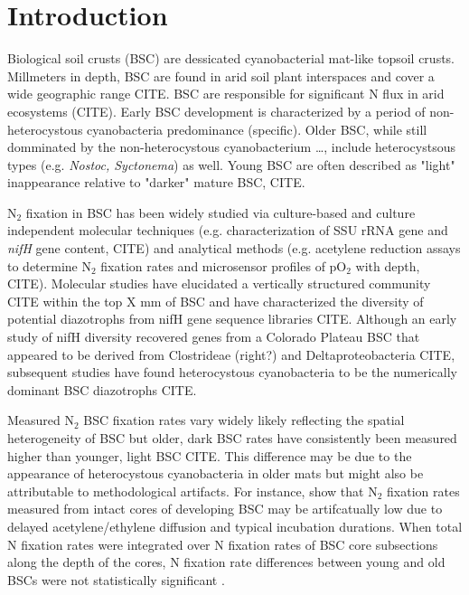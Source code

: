 \section{Introduction}


Biological soil crusts (BSC) are dessicated cyanobacterial mat-like topsoil crusts. Millmeters in depth, BSC are found in arid soil plant interspaces and cover a wide geographic range CITE. BSC are responsible for significant N flux in arid ecosystems (CITE). Early BSC development is characterized by a period of non-heterocystous cyanobacteria predominance (specific). Older BSC, while still domminated by the non-heterocystous cyanobacterium \dots, include heterocystsous types (e.g. \textit{Nostoc, Syctonema}) as well. Young BSC are often described as "light" inappearance relative to "darker" mature BSC, CITE.

N$_{2}$ fixation in BSC has been widely studied via culture-based and culture independent molecular techniques (e.g. characterization of SSU rRNA gene and \textit{nifH} gene content, CITE) and analytical methods (e.g. acetylene reduction assays to determine N$_{2}$ fixation rates and microsensor profiles of pO$_{2}$ with depth, CITE). Molecular studies have elucidated a vertically structured community CITE within the top X mm of BSC and have characterized the diversity of potential diazotrophs from nifH gene sequence libraries CITE. Although an early study of nifH diversity recovered genes from a Colorado Plateau BSC that appeared to be derived from Clostrideae (right?) and Deltaproteobacteria CITE, subsequent studies have found heterocystous cyanobacteria to be the numerically dominant BSC diazotrophs CITE. 

Measured N$_{2}$ BSC fixation rates vary widely likely reflecting the spatial heterogeneity of BSC but older, dark BSC rates have consistently been measured higher than younger, light BSC CITE. This difference may be due to the appearance of heterocystous cyanobacteria in older mats but might also be attributable to methodological artifacts. For instance, \citet{15643930} show that N$_{2}$ fixation rates measured from intact cores of developing BSC may be artifcatually low due to delayed acetylene/ethylene diffusion and typical incubation durations. When total N fixation rates were integrated over N fixation rates of BSC core subsections along the depth of the cores, N fixation rate differences between young and old BSCs were not statistically significant \cite{15643930}.

